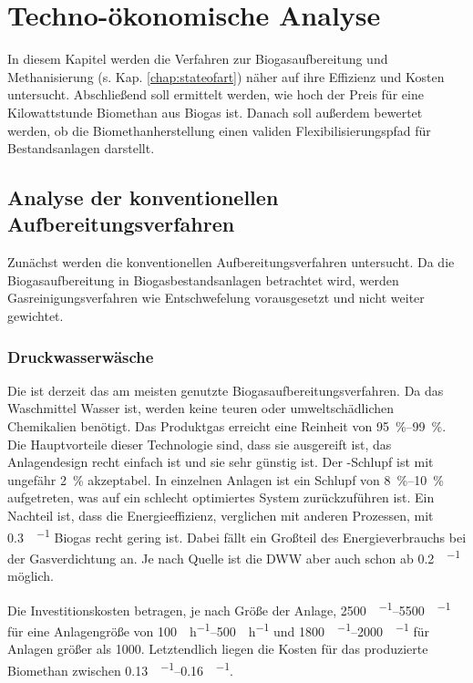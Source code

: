 
\section{Techno-ökonomische Analyse}\label{chap:chap_tececon}

In diesem Kapitel werden die Verfahren zur Biogasaufbereitung und Methanisierung (s. Kap. \ref{chap:stateofart}) näher auf ihre Effizienz und Kosten untersucht. Abschließend soll ermittelt werden, wie hoch der Preis für eine Kilowattstunde Biomethan aus Biogas ist. Danach soll außerdem bewertet werden, ob die Biomethanherstellung einen validen Flexibilisierungspfad für Bestandsanlagen darstellt. 

\subsection{Analyse der konventionellen Aufbereitungsverfahren}
Zunächst werden die konventionellen Aufbereitungsverfahren untersucht. Da die Biogasaufbereitung in Biogasbestandsanlagen betrachtet wird, werden Gasreinigungsverfahren wie Entschwefelung vorausgesetzt und nicht weiter gewichtet.  \smallskip


\subsubsection{Druckwasserwäsche}
Die  ist derzeit das am meisten genutzte Biogasaufbereitungsverfahren. Da das Waschmittel Wasser ist, werden keine teuren oder umweltschädlichen Chemikalien benötigt. Das Produktgas erreicht eine  Reinheit von \SIrange{95}{99}{\percent}. Die Hauptvorteile dieser Technologie sind, dass sie ausgereift ist, das Anlagendesign recht einfach ist und sie sehr günstig ist. Der -Schlupf ist mit ungefähr \SI{2}{\percent} akzeptabel. In einzelnen Anlagen ist ein Schlupf von \SIrange{8}{10}{\percent} aufgetreten, was auf ein schlecht optimiertes System zurückzuführen ist. Ein Nachteil ist, dass die Energieeffizienz, verglichen mit anderen Prozessen, mit \SI{0,3}{\kwh\per\normvol} Biogas recht gering ist. Dabei fällt ein Großteil des Energieverbrauchs bei der Gasverdichtung an. Je nach Quelle ist die \gls{DWW} aber auch schon ab \SI{0,2}{\kwh\per\normvol} möglich. \parencite{Emp18} \parencite{Coll17}\smallskip

Die Investitionskosten betragen, je nach Größe der Anlage, \SIrange{2500}{5500}{\sieuro\per\normvolh} für eine Anlagengröße von \SIrange{100}{500}{\normvol\per\hour} und \SIrange{1800}{2000}{\sieuro\per\normvolh} für Anlagen größer als \SI{1000}{\normvolh}. Letztendlich liegen die Kosten für das produzierte Biomethan zwischen \SIrange{0,13}{0,16}{\sieuro\per\normvol}. \parencite{Emp18} \parencite{KGKK2019} \parencite{Struk20}\smallskip

